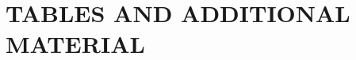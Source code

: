\documentclass[twoside]{article}
\def\log{\hbox{log}}
\newcommand{\bX}{\mathbf{X}}
\newcommand{\bY}{\mathbf{Y}}
\newcommand{\0}{\mathbf{0}}
\newcommand{\1}{\mathbf{1}}
\newcommand*{\QEDB}{\hfill\ensuremath{\square}}
\numberwithin{equation}{section}
\begin{document}

\newpage
\section{TABLES AND ADDITIONAL MATERIAL}\label{supB}
\end{document}

